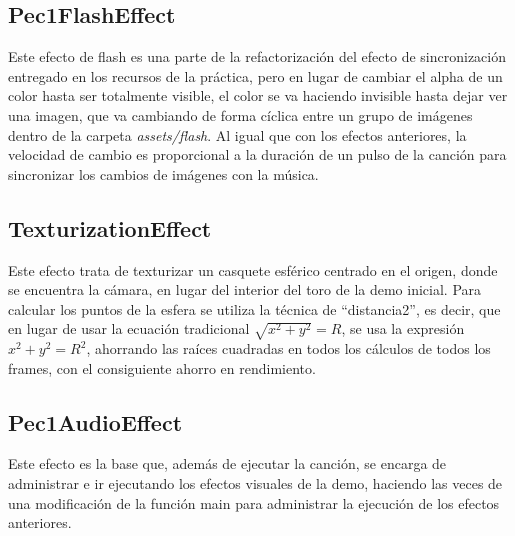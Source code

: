 \documentclass[12pt]{article}%
\begin{document}
\subsection{Pec1FlashEffect}
	Este efecto de flash es una parte de la refactorización del efecto de sincronización entregado en los recursos de la práctica, pero en lugar de cambiar el alpha de un color hasta ser totalmente visible, el color se va haciendo invisible hasta dejar ver una imagen, que va cambiando de forma cíclica entre un grupo de imágenes dentro de la carpeta \textit{assets/flash}. Al igual que con los efectos anteriores, la velocidad de cambio es proporcional a la duración de un pulso de la canción para sincronizar los cambios de imágenes con la música.

\subsection{TexturizationEffect}
	Este efecto trata de texturizar un casquete esférico centrado en el origen, donde se encuentra la cámara, en lugar del interior del toro de la demo inicial. Para calcular los puntos de la esfera se utiliza la técnica de ``distancia2'', es decir, que en lugar de usar la ecuación tradicional $\sqrt{x^2 + y^2} = R$, se usa la expresión $x^2 + y^2 = R^2$, ahorrando las raíces cuadradas en todos los cálculos de todos los frames, con el consiguiente ahorro en rendimiento.

\subsection{Pec1AudioEffect}
	Este efecto es la base que, además de ejecutar la canción, se encarga de administrar e ir ejecutando los efectos visuales de la demo, haciendo las veces de una modificación de la función main para administrar la ejecución de los efectos anteriores.
\end{document}
